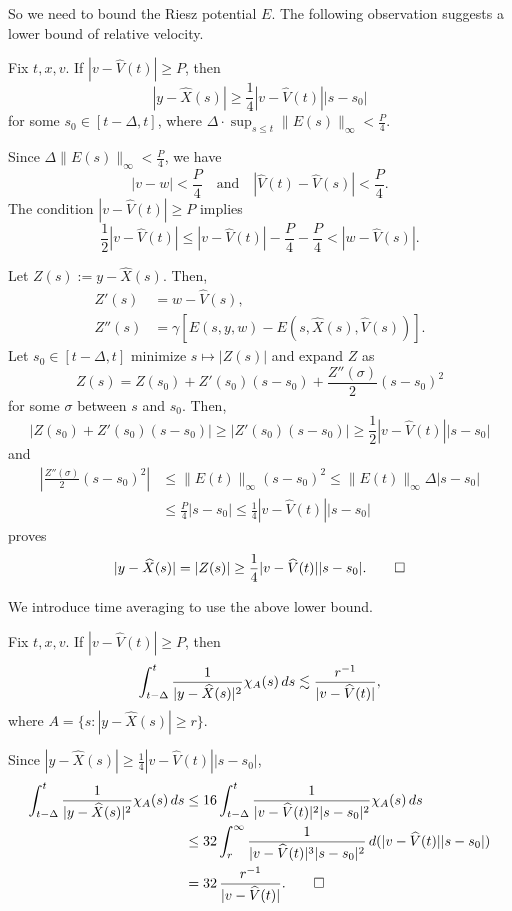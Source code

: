 \documentclass[11pt]{amsart}
\begin{document}
So we need to bound the Riesz potential $E$.
The following observation suggests a lower bound of relative velocity.
\begin{clm}
Fix $t,x,v$.
If $|v-\hat V(t)|\ge P$, then
\[|y-\hat X(s)|\ge\frac14|v-\hat V(t)||s-s_0|\]
for some $s_0\in[t-\Delta,t]$, where $\Delta\cdot\sup_{s\le t}\|E(s)\|_\infty<\frac P4$.
\end{clm}
\begin{pf}
Since $\Delta\|E(s)\|_\infty<\frac P4$, we have
\[|v-w|<\frac P4\quad\text{and}\quad|\hat V(t)-\hat V(s)|<\frac P4.\]
The condition $|v-\hat V(t)|\ge P$ implies
\[\frac12|v-\hat V(t)|\le|v-\hat V(t)|-\frac P4-\frac P4<|w-\hat V(s)|.\]

Let $Z(s):=y-\hat X(s)$.
Then,
\begin{align*}
Z'(s)&=w-\hat V(s),\\
Z''(s)&=\gamma[E(s,y,w)-E(s,\hat X(s),\hat V(s))].
\end{align*}
Let $s_0\in[t-\Delta,t]$ minimize $s\mapsto|Z(s)|$ and expand $Z$ as
\[Z(s)=Z(s_0)+Z'(s_0)(s-s_0)+\frac{Z''(\sigma)}2(s-s_0)^2\]
for some $\sigma$ between $s$ and $s_0$.
Then,
\[|Z(s_0)+Z'(s_0)(s-s_0)|\ge|Z'(s_0)(s-s_0)|\ge\frac12|v-\hat V(t)||s-s_0|\]
and
\begin{align*}
|\frac{Z''(\sigma)}2(s-s_0)^2|
&\le\|E(t)\|_\infty(s-s_0)^2
\le\|E(t)\|_\infty\Delta|s-s_0|\\
&\le\frac P4|s-s_0|
\le\frac14|v-\hat V(t)||s-s_0|
\end{align*}
proves
\[|y-\hat X(s)|=|Z(s)|\ge\frac14|v-\hat V(t)||s-s_0|.\qedhere\]
\end{pf}

We introduce time averaging to use the above lower bound.
\begin{clm}
Fix $t,x,v$.
If $|v-\hat V(t)|\ge P$, then
\[\int_{t-\Delta}^t\frac1{|y-\hat X(s)|^2}\chi_A(s)\,ds\les\frac{r^{-1}}{|v-\hat V(t)|},\]
where $A=\{s:|y-\hat X(s)|\ge r\}$.
\end{clm}
\begin{pf}
Since $|y-\hat X(s)|\ge\frac14|v-\hat V(t)||s-s_0|$,
\begin{align*}
\int_{t-\Delta}^t\frac1{|y-\hat X(s)|^2}\chi_A(s)\,ds
&\le16\int_{t-\Delta}^t\frac1{|v-\hat V(t)|^2|s-s_0|^2}\chi_A(s)\,ds\\
&\le32\int_r^\infty\frac1{|v-\hat V(t)|^3|s-s_0|^2}\,d(|v-\hat V(t)||s-s_0|)\\
&=32\,\frac{r^{-1}}{|v-\hat V(t)|}.\qedhere
\end{align*}
\end{pf}
\end{document}
